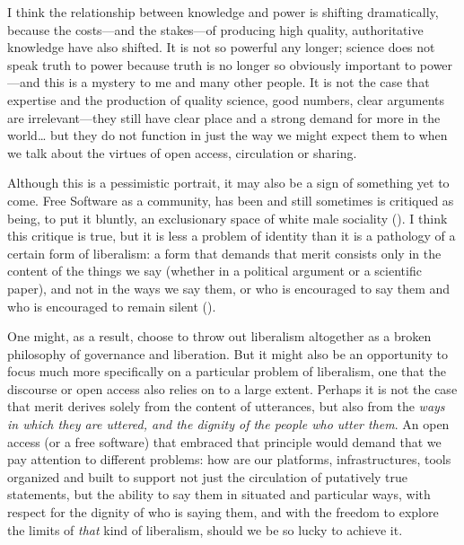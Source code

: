 \documentclass[11pt]{article}
\begin{document}
I think the relationship between knowledge and power is shifting dramatically, because the costs---and the stakes---of producing high quality, authoritative knowledge have also shifted.  It is not so powerful any longer; science does not speak truth to power because truth is no longer so obviously important to power---and this is a mystery to me and many other people.  It is not the case that expertise and the production of quality science, good numbers, clear arguments are irrelevant---they still have  clear place and a strong demand for more in the world\ldots{} but they do not function in just the way we might expect them to when we talk about the virtues of open access, circulation or sharing. 

Although this is a pessimistic portrait, it may also be a sign of something yet to come.  Free Software as a community, has been and still sometimes is critiqued as being, to put it bluntly, an exclusionary space of white male sociality (\cite{nafus_patches_2012,massanari2016fapp,ford2017canedit,reagle2013freeassexis}).  I think this critique is true, but it is less a problem of identity than it is a pathology of a certain form of liberalism: a form that demands that merit consists only in the content of the things we say (whether in a political argument or a scientific paper), and not in the ways we say them, or who is encouraged to say them and who is encouraged to remain silent (\cite{dunbar-hester_low_2014}).

One might, as a result, choose to throw out liberalism altogether as a broken philosophy of governance and liberation.  But it might also be an opportunity to focus much more specifically on a particular problem of liberalism, one that the discourse or open access also relies on to a large extent.  Perhaps it is not the case that merit derives solely from the content of utterances, but also from the \emph{ways in which they are uttered, and the dignity of the people who utter them}.  An open access (or a free software) that embraced that principle would demand that we pay attention to different problems:  how are our platforms, infrastructures, tools organized and built to support not just the circulation of putatively true statements, but the ability to say them in situated and particular ways, with respect for the dignity of who is saying them, and with the freedom to explore the limits of \emph{that} kind of liberalism, should we be so lucky to achieve it. 

\printbibliography
\end{document}

